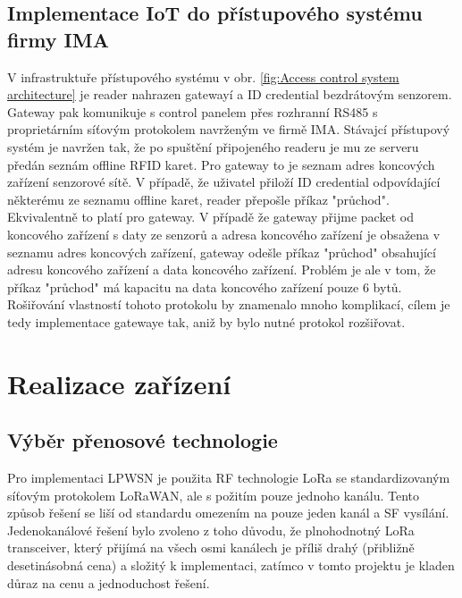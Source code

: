 \section{Implementace IoT do přístupového systému firmy IMA}
\label{sec:Implementace IoT do přístupového systému firmy IMA}
V infrastruktuře přístupového systému v obr. \ref{fig:Access control system architecture} je reader nahrazen gatewayí a ID credential bezdrátovým senzorem. 
Gateway pak komunikuje s control panelem přes rozhranní RS485 s proprietárním síťovým protokolem navrženým ve firmě IMA. 
Stávajcí přístupový systém je navržen tak, že po spuštění připojeného readeru je mu ze serveru předán seznám offline RFID karet. 
Pro gateway to je seznam adres koncových zařízení senzorové sítě. 
V případě, že uživatel přiloží ID credential odpovídající některému ze seznamu offline karet, reader přepošle příkaz "průchod".
Ekvivalentně to platí pro gateway. 
V případě že gateway přijme packet od koncového zařízení s daty ze senzorů a adresa koncového zařízení je obsažena v seznamu adres koncových zařízení,
gateway odešle příkaz "průchod" obsahující adresu koncového zařízení a data koncového zařízení.
Problém je ale v tom, že příkaz "průchod" má kapacitu na data koncového zařízení pouze 6 bytů.
Rošiřování vlastností tohoto protokolu by znamenalo mnoho komplikací, 
cílem je tedy implementace gatewaye tak, aniž by bylo nutné protokol rozšiřovat.



\chapter{Realizace zařízení}

\section{Výběr přenosové technologie}
Pro implementaci LPWSN je použita RF technologie LoRa se standardizovaným síťovým protokolem LoRaWAN, ale s požitím pouze jednoho kanálu.
Tento způsob řešení se liší od standardu omezením na pouze jeden kanál a SF vysílání.
Jedenokanálové řešení bylo zvoleno z toho důvodu, že plnohodnotný LoRa transceiver, který přijímá na všech osmi kanálech je příliš drahý (přibližně desetinásobná cena) a složitý k implementaci, zatímco v tomto projektu je kladen důraz na cenu a jednoduchost řešení.

